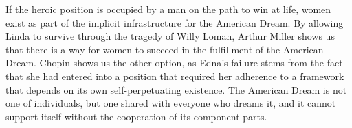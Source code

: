 If the heroic position is occupied by a man on the path to win at life, women
exist as part of the implicit infrastructure for the American Dream. By allowing
Linda to survive through the tragedy of Willy Loman, Arthur Miller shows us that
there is a way for women to succeed in the fulfillment of the American Dream.
Chopin shows us the other option, as Edna's failure stems from the fact that she
had entered into a position that required her adherence to a framework that
depends on its own self-perpetuating existence. The American Dream is not one of
individuals, but one shared with everyone who dreams it, and it cannot support
itself without the cooperation of its component parts.
